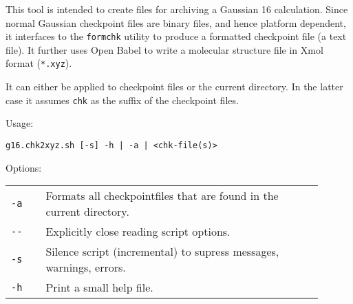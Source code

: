 \documentclass[   %
  final,          %
  a4paper         %
]{article}
\begin{document}
This tool is intended to create files for archiving a Gaussian 16 calculation.
Since normal Gaussian checkpoint files are binary files, and hence platform dependent,
it interfaces to the \texttt{formchk} utility to produce a formatted checkpoint file (a text file).
It further uses Open Babel to write a molecular structure file in Xmol format (\texttt{*.xyz}).

It can either be applied to checkpoint files or the current directory.
In the latter case it assumes \texttt{chk} as the suffix of the checkpoint files.

Usage: 

\lstinline`g16.chk2xyz.sh [-s] -h | -a | <chk-file(s)>`

Options:

\begin{tabular}{p{0.1\linewidth}p{0.8\linewidth}}
  {\lstinline`-a`}       & Formats all checkpointfiles that are found in the current directory. \\
  {\lstinline`--`}       & Explicitly close reading script options. \\
  {\lstinline`-s`}       & Silence script (incremental) to supress messages, warnings, errors. \\
  {\lstinline`-h`}       & Print a small help file. \\
\end{tabular}
\end{document}
